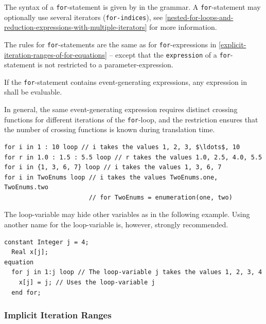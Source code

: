 The syntax of a \lstinline!for!-statement is given by  in the grammar.
A \lstinline!for!-statement may optionally use several iterators (\lstinline!for-indices!), see \cref{nested-for-loops-and-reduction-expressions-with-multiple-iterators} for more information.

The rules for \lstinline!for!-statements are the same as for \lstinline!for!-expressions in \cref{explicit-iteration-ranges-of-for-equations} -- except that the \lstinline!expression! of a \lstinline!for!-statement is not restricted to a parameter-expression.

If the \lstinline!for!-statement contains event-generating expressions, any expression in  shall be evaluable.

\begin{nonnormative}
In general, the same event-generating expression requires distinct crossing functions for different iterations of the \lstinline!for!-loop, and the restriction ensures that the number of crossing functions is known during translation time.
\end{nonnormative}

\begin{example}
\begin{lstlisting}[language=modelica]
for i in 1 : 10 loop // i takes the values 1, 2, 3, $\ldots$, 10
for r in 1.0 : 1.5 : 5.5 loop // r takes the values 1.0, 2.5, 4.0, 5.5
for i in {1, 3, 6, 7} loop // i takes the values 1, 3, 6, 7
for i in TwoEnums loop // i takes the values TwoEnums.one, TwoEnums.two
                       // for TwoEnums = enumeration(one, two)
\end{lstlisting}
The loop-variable may hide other variables as in the following example.
Using another name for the loop-variable is, however, strongly recommended.
\begin{lstlisting}[language=modelica]
  constant Integer j = 4;
  Real x[j];
equation
  for j in 1:j loop // The loop-variable j takes the values 1, 2, 3, 4
    x[j] = j; // Uses the loop-variable j
  end for;
\end{lstlisting}
\end{example}


\subsubsection{Implicit Iteration Ranges}\label{implicit-iteration-ranges}

